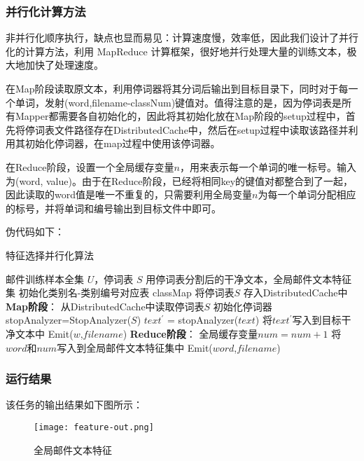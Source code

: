 \documentclass[lang=cn,11pt]{elegantpaper}
\begin{document}
\subsubsection{并行化计算方法}
非并行化顺序执行，缺点也显而易见：计算速度慢，效率低，因此我们设计了并行化的计算方法，利用 MapReduce 计算框架，很好地并行处理大量的训练文本，极大地加快了处理速度。\par
在Map阶段读取原文本，利用停词器将其分词后输出到目标目录下，同时对于每一个单词，发射(word,filename-classNum)键值对。值得注意的是，因为停词表是所有Mapper都需要各自初始化的，因此将其初始化放在Map阶段的setup过程中，首先将停词表文件路径存在DistributedCache中，然后在setup过程中读取该路径并利用其初始化停词器，在map过程中使用该停词器。\par
在Reduce阶段，设置一个全局缓存变量$n$，用来表示每一个单词的唯一标号。输入为(word, value)。由于在Reduce阶段，已经将相同key的键值对都整合到了一起，因此读取的word值是唯一不重复的，只需要利用全局变量$n$为每一个单词分配相应的标号，并将单词和编号输出到目标文件中即可。\par
伪代码如下：
\begin{algorithm}[htb]  
  \caption{特征选择并行化算法}  
  \label{alg:Framwork}
  \begin{algorithmic}[1]
    \Require
    邮件训练样本全集 $U$，停词表 $S$
    \Ensure 
    用停词表分割后的干净文本，全局邮件文本特征集
    \State 初始化类别名-类别编号对应表 classMap
    \State 将停词表$S$ 存入DistributedCache中
    \State \textbf{Map阶段}：
    \State 从DistributedCache中读取停词表$S$
    \State 初始化停词器 stopAnalyzer=StopAnalyzer($S$)
    \EndFunction
      \State $text^\prime$ = stopAnalyzer($text$)
      \State 将$text^\prime$写入到目标干净文本中
        \State Emit($w$,$filename$)
      \EndFor
    \EndFunction
    \State \textbf{Reduce阶段}：
      \State 全局缓存变量$num=num+1$
      \State 将$word$和$num$写入到全局邮件文本特征集中
      \State Emit($word$,$filename$)
    \EndFunction
  \end{algorithmic}
\end{algorithm}

\subsubsection{运行结果}
该任务的输出结果如下图所示：
\begin{figure}[htbp]
	\centering
	\texttt{[image: feature-out.png]}
	\caption{全局邮件文本特征 \label{fig:feature-out}}
\end{figure}
\end{document}
